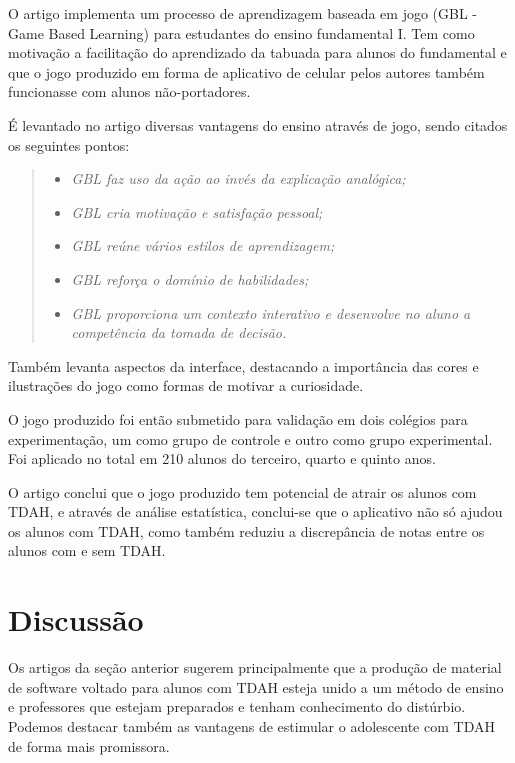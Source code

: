 O artigo\cite{sanchez} implementa um processo de aprendizagem baseada em jogo (GBL - Game Based Learning) para estudantes do ensino fundamental I. Tem como motivação a facilitação do aprendizado da tabuada para alunos do fundamental e que o jogo produzido em forma de aplicativo de celular pelos autores também funcionasse com alunos não-portadores.

É levantado no artigo diversas vantagens do ensino através de jogo, sendo citados os seguintes pontos:

\begin{quote}
\begin{itemize}
\item \textit{GBL faz uso da ação ao invés da explicação analógica;}
\item \textit{GBL cria motivação e satisfação pessoal;}
\item \textit{GBL reúne vários estilos de aprendizagem;}
\item \textit{GBL reforça o domínio de habilidades;}
\item \textit{GBL proporciona um contexto interativo e desenvolve no aluno a competência da tomada de decisão.}
\end{itemize}
\cite{sanchez}
\end{quote}

Também levanta aspectos da interface, destacando a importância das cores e ilustrações do jogo como formas de motivar a curiosidade. 

O jogo produzido foi então submetido para validação em dois colégios para experimentação, um como grupo de controle e outro como grupo experimental. Foi aplicado no total em 210 alunos do terceiro, quarto e quinto anos.

O artigo conclui que o jogo produzido tem potencial de atrair os alunos com TDAH, e através de análise estatística, conclui-se que o aplicativo não só ajudou os alunos com TDAH, como também reduziu a discrepância de notas entre os alunos com e sem TDAH.

\section{Discussão}

Os artigos da seção anterior sugerem principalmente que a produção de material de software voltado para alunos com TDAH esteja unido a um método de ensino e professores que estejam preparados e tenham conhecimento do distúrbio. Podemos destacar também as vantagens de estimular o adolescente com TDAH de forma mais promissora.

